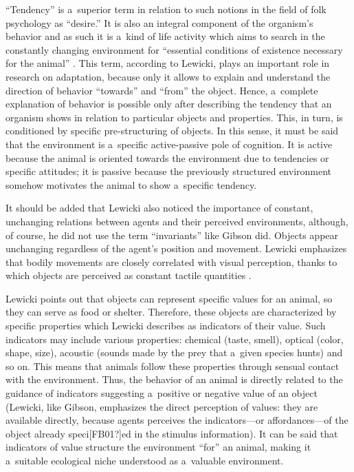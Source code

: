 \documentclass[%
manuscript=article,
year=2024,
volume=77,
doi=00000.000,
]{zfn}
\begin{document}
``Tendency'' is a~superior term in relation to such notions in the field of folk psychology as ``desire.'' It is also an integral component of the organism's behavior and as such it is a~kind of life activity which aims to search in the constantly changing environment for ``essential conditions of existence necessary for the animal'' 
\parencite[][pp.168–169]{lewicki_procesy_1960}. %
 This term, according to Lewicki, plays an important role in research on adaptation, because only it allows to explain and understand the direction of behavior ``towards'' and ``from'' the object. Hence, a~complete explanation of behavior is possible only after describing the tendency that an organism shows in relation to particular objects and properties. This, in turn, is conditioned by specific pre-structuring of objects. In this sense, it must be said that the environment is a~specific active-passive pole of cognition. It is active because the animal is oriented towards the environment due to tendencies or specific attitudes; it is passive because the previously structured environment somehow motivates the animal to show a~specific tendency.



It should be added that Lewicki also noticed the importance of constant, unchanging relations between agents and their perceived environments, although, of course, he did not use the term ``invariants'' like Gibson did. Objects appear unchanging regardless of the agent's position and movement. Lewicki emphasizes that bodily movements are closely correlated with visual perception, thanks to which objects are perceived as constant tactile quantities 
\parencite[][p.139]{lewicki_procesy_1960}.%




Lewicki points out that objects can represent specific values for an animal, so they can serve as food or shelter. Therefore, these objects are characterized by specific properties which Lewicki describes as indicators of their value. Such indicators may include various properties: chemical (taste, smell), optical (color, shape, size), acoustic (sounds made by the prey that a~given species hunts) and so on. This means that animals follow these properties through sensual contact with the environment. Thus, the behavior of an animal is directly related to the guidance of indicators suggesting a~positive or negative value of an object (Lewicki, like Gibson, emphasizes the direct perception of values: they are available directly, because agents perceives the indicators---or affordances---of the object already speci[FB01?]ed in the stimulus information). It can be said that indicators of value structure the environment ``for'' an animal, making it a~suitable ecological niche understood as a~valuable environment.
\end{document}

